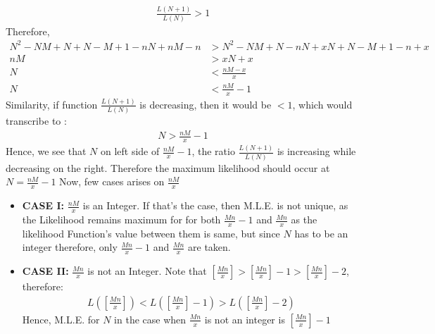 \documentclass[a4paper]{article}
\begin{document}
\begin{equation*}
	\begin{split}
		\frac{L\left( N+1 \right) }{L\left( N \right) } > 1
	\end{split}
\end{equation*}
Therefore,
\begin{equation*}
	\begin{split}
		N^2 -NM + N + N - M + 1 -nN + nM - n &> N^2 - NM + N -nN + xN + N - M + 1 - n + x\\
		nM &> xN + x\\
		N &< \frac{nM - x}{x}\\
		N &< \frac{nM}{x} - 1
	\end{split}
\end{equation*}
Similarity, if function $\frac{L\left( N+1 \right) }{L\left( N \right) }$ is decreasing, then it would be $<1$, which would transcribe to :
 \begin{equation*}
	\begin{split}
		N > \frac{nM}{x} - 1
	\end{split}
\end{equation*}
Hence, we see that $N$ on left side of $\frac{nM}{x} - 1$, the ratio $\frac{L\left( N+1 \right) }{L\left( N \right) }$ is increasing while decreasing on the right.
\newline\newline
Therefore the maximum likelihood should occur at $N = \frac{nM}{x}-1$
\newline\newline
Now, few cases arises on $\frac{nM}{x}$ 
\begin{itemize}
	\item {\textbf{CASE I:} $\frac{nM}{x}$ is an Integer.
		\newline\newline
		If that's the case, then M.L.E. is not unique, as the Likelihood remains maximum for for both $\frac{Mn}{x} - 1$ and $\frac{Mn}{x}$ as the likelihood Function's value between them is same, but since  $N$ has to be an integer therefore, only $\frac{Mn}{x}-1$ and $\frac{Mn}{x}$ are taken. 
		}
	\item{\textbf{CASE II:} $\frac{Mn}{x}$ is not an Integer.
		\newline\newline
		Note that $\left[ \frac{Mn}{x} \right]  >\left[ \frac{Mn}{x} \right] -1>  \left[ \frac{Mn}{x}  \right] - 2$, therefore:
		\begin{equation*}
			\begin{split}
				L\left( \left[\frac{Mn}{x}  \right]  \right) < L\left( \left[ \frac{Mn}{x} \right] -1  \right) > L\left( \left[ \frac{Mn}{x} \right] -2 \right)   	
			\end{split}
		\end{equation*}
		Hence, M.L.E. for $N$ in the case when  $\frac{Mn}{x}$ is not an integer is $\left[ \frac{Mn}{x} \right] -1$
		}
\end{itemize}
\end{document}
